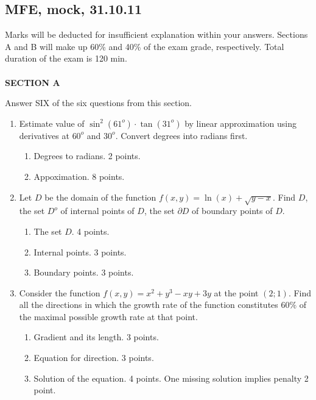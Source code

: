 \subsection{MFE, mock, 31.10.11}
Marks will be deducted for insufficient explanation within your answers. Sections A and B will make up 60\% and 40\% of the exam grade, respectively. Total duration of the exam is 120 min. \\ \\
\textbf{SECTION A}

Answer SIX of the six questions from this section.

\begin{enumerate}

\item Estimate value of $\sin^2(61^{o})\cdot\tan(31^{o})$ by linear approximation using derivatives at $60^{o}$ and $30^{o}$. Convert degrees into radians first.

\begin{enumerate}
\item Degrees to radians. 2 points.
\item Appoximation. 8 points.
\end{enumerate}


\item Let $D$ be the domain of the function $f(x,y)=\ln(x)+\sqrt{y-x}$. Find $D$, the set $D^{o}$ of internal points of $D$, the set $\partial D$ of boundary points of $D$.

\begin{enumerate}
\item The set $D$. 4 points.
\item Internal points. 3 points.
\item Boundary points. 3 points.
\end{enumerate}


\item Consider the function $f(x,y)=x^2+y^3-xy+3y$ at the point $(2;1)$. Find all the directions in which the  growth rate of the function constitutes $60\%$ of the maximal possible growth rate at that point.

\begin{enumerate}
\item Gradient and its length. 3 points.
\item Equation for direction. 3 points.
\item Solution of the equation. 4 points. One missing solution implies penalty 2 point.
\end{enumerate}




\end{enumerate}
